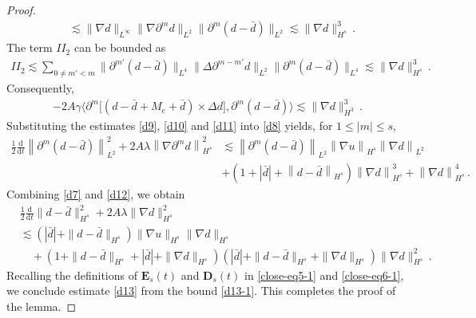 \documentclass[reqno,11pt]{amsart}
\numberwithin{equation}{section}
\def\p{\partial}
\def\d{\mathrm{d}}
\begin{document}
\begin{proof}
\begin{equation*}
\begin{aligned}
&\lesssim \| \nabla d \|_{L^{\infty}} \| \nabla \partial^m d \|_{L^{2}} \| \partial^m (d - \bar{d}) \|_{L^{2}} \lesssim \| \nabla d \|_{H^{s}}^{3}\,.
\end{aligned}
\end{equation*}
The term $II_2$ can be bounded as
\begin{equation*}
\begin{aligned}
 II_2 \lesssim \sum_{0 \neq m' < m} \| \partial^{m'} (d - \bar{d}) \|_{L^{4}} \| \Delta \partial^{m - m'} d \|_{L^{2}} \| \partial^m (d - \bar{d}) \|_{L^{4}} \lesssim\| \nabla d \|_{H^{s}}^{3}\,.
\end{aligned}
\end{equation*}
Consequently,
\begin{equation}\label{d11}
\begin{aligned}
-2A\gamma\langle \p^m\big[(d-\bar{d}+M_e+\bar{d}) \times \Delta d\big], \p^m(d-\bar{d})  \rangle\lesssim\|\nabla d\|_{H^3}^3
 \,.
\end{aligned}
\end{equation}
Substituting the estimates \eqref{d9}, \eqref{d10} and \eqref{d11} into \eqref{d8} yields, for $1\le |m|\le s$,
\begin{equation}\label{d12}
\begin{aligned}
\frac{1}{2} \frac{\d}{\d t} \left\| \partial^m (d - \bar{d}) \right\|_{L^2}^2 + 2A \lambda \left\|\nabla \partial^m d \right\|_{H^s}^2 & \lesssim \left\| \partial^m (d - \bar{d}) \right\|_{L^2} \left\| \nabla u \right\|_{H^s} \left\| \nabla d \right\|_{L^2} \\
& + \left( 1 + |\bar{d}| + \left\| d - \bar{d} \right\|_{H^s} \right) \left\| \nabla d \right\|_{H^s}^3 + \left\| \nabla d \right\|_{H^s}^4
 \,.
\end{aligned}
\end{equation}
Combining \eqref{d7} and \eqref{d12}, we obtain
\begin{equation}\label{d13-1}
\begin{aligned}
&\frac{1}{2} \frac{\d}{\d t} \| d - \bar{d} \|_{H^s}^2 + 2A \lambda \| \nabla d \|_{H^s}^2 \\ 
& \lesssim \left( |\bar{d}| + \| d - \bar{d} \|_{H^s} \right) \| \nabla u \|_{H^s} \| \nabla d \|_{H^s} \\
& \quad+ \left( 1 + \| d - \bar{d} \|_{H^s} + |\bar{d}| + \| \nabla d \|_{H^s} \right) \left( |\bar{d}| + \| d - \bar{d} \|_{H^s} + \| \nabla d \|_{H^s} \right) \| \nabla d \|_{H^s}^2 \,.
\end{aligned}
\end{equation}
Recalling the definitions of $\mathbf{E}_s(t)$ and $\mathbf{D}_s(t)$ in \eqref{close-eq5-1} and \eqref{close-eq6-1}, we conclude estimate \eqref{d13} from the bound \eqref{d13-1}. This completes the proof of the lemma.
\end{proof}
\end{document}
